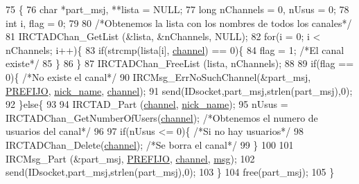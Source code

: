 \begin{DoxyCode}
75                                                                          \{
76         \textcolor{keywordtype}{char} *part\_msj, **lista = NULL;
77         \textcolor{keywordtype}{long} nChannels = 0, nUsus = 0;
78         \textcolor{keywordtype}{int} i, flag = 0;
79 
80         \textcolor{comment}{/*Obtenemos la lista con los nombres de todos los canales*/}
81         IRCTADChan\_GetList (&lista, &nChannels, NULL);
82         \textcolor{keywordflow}{for}(i = 0; i < nChannels; i++)\{
83                 \textcolor{keywordflow}{if}(strcmp(lista[i], \hyperlink{_g-2361-06-_p1-_server_8c_a842ca2f026578e5c479c095ff3335969}{channel}) == 0)\{
84                         flag = 1; \textcolor{comment}{/*El canal existe*/}
85                 \}
86         \}
87         IRCTADChan\_FreeList (lista, nChannels);
88 
89         \textcolor{keywordflow}{if}(flag == 0)\{ \textcolor{comment}{/*No existe el canal*/}
90                 IRCMsg\_ErrNoSuchChannel(&part\_msj, \hyperlink{_g-2361-06-_p1-_server_8h_a78c658ff923693099f7b621e7c351129}{PREFIJO}, \hyperlink{_g-2361-06-_p1-_server_8c_aabbf66718cda228b924a4a9441eadf62}{nick\_name}, 
      \hyperlink{_g-2361-06-_p1-_server_8c_a842ca2f026578e5c479c095ff3335969}{channel});
91                 send(IDsocket,part\_msj,strlen(part\_msj),0);
92         \}\textcolor{keywordflow}{else}\{
93 
94                 IRCTAD\_Part (\hyperlink{_g-2361-06-_p1-_server_8c_a842ca2f026578e5c479c095ff3335969}{channel}, \hyperlink{_g-2361-06-_p1-_server_8c_aabbf66718cda228b924a4a9441eadf62}{nick\_name});
95                 nUsus = IRCTADChan\_GetNumberOfUsers(\hyperlink{_g-2361-06-_p1-_server_8c_a842ca2f026578e5c479c095ff3335969}{channel}); \textcolor{comment}{/*Obtenemos el numero de usuarios del
       canal*/}
96 
97                 \textcolor{keywordflow}{if}(nUsus <= 0)\{ \textcolor{comment}{/*Si no hay usuarios*/}
98                         IRCTADChan\_Delete(\hyperlink{_g-2361-06-_p1-_server_8c_a842ca2f026578e5c479c095ff3335969}{channel}); \textcolor{comment}{/*Se borra el canal*/}
99                 \}
100 
101                 IRCMsg\_Part (&part\_msj, \hyperlink{_g-2361-06-_p1-_server_8h_a78c658ff923693099f7b621e7c351129}{PREFIJO}, \hyperlink{_g-2361-06-_p1-_server_8c_a842ca2f026578e5c479c095ff3335969}{channel}, \hyperlink{_g-2361-06-_p1-_server_8c_a32d2f5216cddb59c7cc8fb2806a7e727}{msg});
102                 send(IDsocket,part\_msj,strlen(part\_msj),0);
103         \}
104         free(part\_msj); 
105 \}
\end{DoxyCode}
